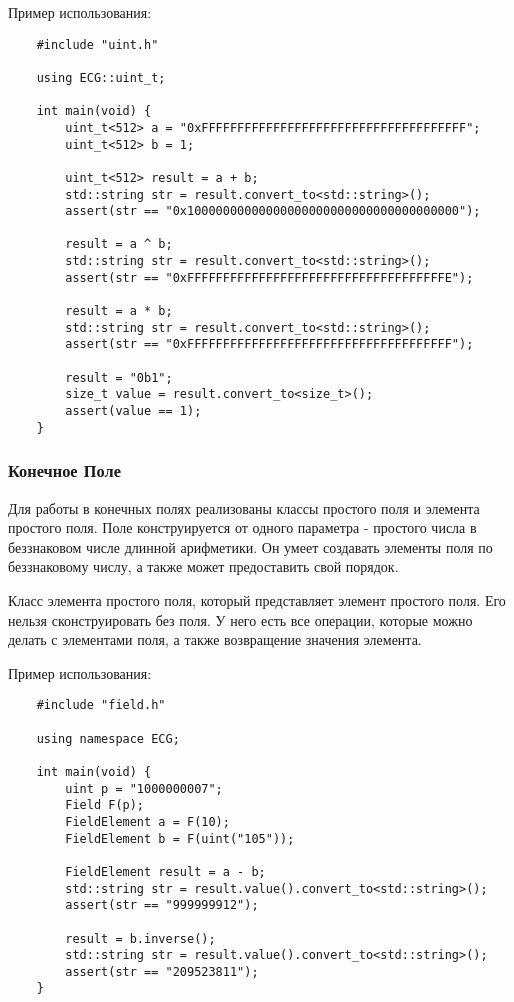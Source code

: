 \documentclass{article}
\begin{document}
   Пример использования:
    \begin{frame}

\begin{lstlisting}
    #include "uint.h"

    using ECG::uint_t;

    int main(void) {
        uint_t<512> a = "0xFFFFFFFFFFFFFFFFFFFFFFFFFFFFFFFFFFFFF";
        uint_t<512> b = 1;

        uint_t<512> result = a + b;
        std::string str = result.convert_to<std::string>();
        assert(str == "0x10000000000000000000000000000000000000");

        result = a ^ b;
        std::string str = result.convert_to<std::string>();
        assert(str == "0xFFFFFFFFFFFFFFFFFFFFFFFFFFFFFFFFFFFFE");

        result = a * b;
        std::string str = result.convert_to<std::string>();
        assert(str == "0xFFFFFFFFFFFFFFFFFFFFFFFFFFFFFFFFFFFFF");

        result = "0b1";
        size_t value = result.convert_to<size_t>();
        assert(value == 1);
    }
\end{lstlisting}
\end{frame}
\subsubsection{Конечное Поле}
   Для работы в конечных полях реализованы классы простого поля и элемента простого поля. Поле конструируется от одного параметра - простого числа в беззнаковом числе длинной арифметики. Он умеет создавать элементы поля по беззнаковому числу, а также может предоставить свой порядок.

   Класс элемента простого поля, который представляет элемент простого поля. Его нельзя сконструировать без поля. У него есть все операции, которые можно делать с элементами поля, а также возвращение значения элемента.

    Пример использования:
    \begin{frame}

\begin{lstlisting}
    #include "field.h"

    using namespace ECG; 

    int main(void) {
        uint p = "1000000007";
        Field F(p);
        FieldElement a = F(10);
        FieldElement b = F(uint("105"));

        FieldElement result = a - b;
        std::string str = result.value().convert_to<std::string>();
        assert(str == "999999912");

        result = b.inverse();
        std::string str = result.value().convert_to<std::string>();
        assert(str == "209523811");
    }
\end{lstlisting}
\end{frame}
\end{document}
